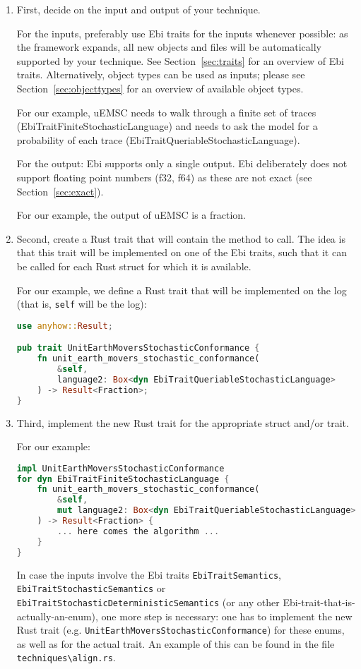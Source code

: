 \documentclass{article}
\begin{document}
			\begin{enumerate}
				\item First, decide on the input and output of your technique.
				
				For the inputs, preferably use Ebi traits for the inputs whenever possible: as the framework expands, all new objects and files will be automatically supported by your technique.
				See Section~\ref{sec:traits} for an overview of Ebi traits.
				Alternatively, object types can be used as inputs; please see Section~\ref{sec:objecttypes} for an overview of available object types.
				
				For our example, uEMSC needs to walk through a finite set of traces (EbiTraitFiniteStochasticLanguage) and needs to ask the model for a probability of each trace (EbiTraitQueriableStochasticLanguage).
				
				For the output: Ebi supports only a single output.
				Ebi deliberately does not support floating point numbers (f32, f64) as these are not exact (see Section~\ref{sec:exact}).
				
				For our example, the output of uEMSC is a fraction.
				
				\item Second, create a Rust trait that will contain the method to call.
				The idea is that this trait will be implemented on one of the Ebi traits, such that it can be called for each Rust struct for which it is available.
				
				For our example, we define a Rust trait that will be implemented on the log (that is, \texttt{self} will be the log):
\begin{lstlisting}[language=Rust, style=boxed]
use anyhow::Result;

pub trait UnitEarthMoversStochasticConformance {
    fn unit_earth_movers_stochastic_conformance(
    	&self, 
    	language2: Box<dyn EbiTraitQueriableStochasticLanguage>
    ) -> Result<Fraction>;
}
\end{lstlisting}				
				
				 \item Third, implement the new Rust trait for the appropriate struct and/or trait.
				 
				 For our example:
\begin{lstlisting}[language=Rust, style=boxed]
impl UnitEarthMoversStochasticConformance 
for dyn EbiTraitFiniteStochasticLanguage {
    fn unit_earth_movers_stochastic_conformance(
    	&self, 
    	mut language2: Box<dyn EbiTraitQueriableStochasticLanguage>
    ) -> Result<Fraction> {   
    	... here comes the algorithm ...
    }
}
\end{lstlisting}

				In case the inputs involve the Ebi traits \texttt{EbiTraitSemantics}, \texttt{EbiTraitStochasticSemantics} or \texttt{EbiTraitStochasticDeterministicSemantics} (or any other Ebi-trait-that-is-actually-an-enum), one more step is necessary: one has to implement the new Rust trait (e.g. \texttt{UnitEarthMoversStochasticConformance}) for these enums, as well as for the actual trait.
				An example of this can be found in the file \verb=techniques\align.rs=.
			\end{enumerate}
			
\end{document}
